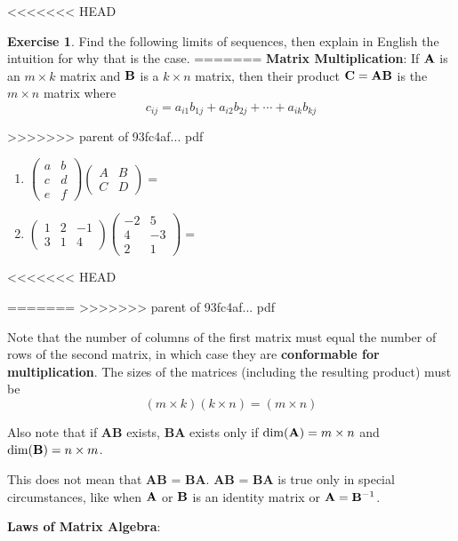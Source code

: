 \documentclass[]{book}
\theoremstyle{definition}
\theoremstyle{definition}
\theoremstyle{definition}
\newtheorem{exercise}{Exercise}[chapter]
\theoremstyle{remark}
\begin{document}
<<<<<<< HEAD
\begin{exercise}
\protect\hypertarget{exr:limseq2}{}{\label{exr:limseq2} }Find the following limits of sequences, then explain in English the intuition for why that is the case.
=======
\textbf{Matrix Multiplication}: If \({\bf A}\) is an \(m\times k\) matrix and \(\bf B\) is a \(k\times n\) matrix, then their product \(\bf C = A B\) is the \(m\times n\) matrix where
\[c_{ij}=a_{i1}b_{1j}+a_{i2}b_{2j}+\cdots+a_{ik}b_{kj}\]

\protect\hypertarget{exm:matrixmulti}{}{\label{exm:matrixmulti} }
>>>>>>> parent of 93fc4af... pdf

\begin{enumerate}
\def\labelenumi{\arabic{enumi}.}
\item
  \(\begin{pmatrix} a&b\\c&d\\e&f \end{pmatrix} \begin{pmatrix} A&B\\C&D \end{pmatrix}  =\)
\item
  \(\begin{pmatrix} 1&2&-1\\3&1&4 \end{pmatrix} \begin{pmatrix} -2&5\\4&-3\\2&1\end{pmatrix} =\)
\end{enumerate}
<<<<<<< HEAD
\end{exercise}
=======
>>>>>>> parent of 93fc4af... pdf

Note that the number of columns of the first matrix must equal the number of rows of the second matrix, in which case they are \textbf{conformable for multiplication}. The sizes of the matrices (including the resulting product) must be \[(m\times k)(k\times n)=(m\times n)\]

Also note that if \textbf{AB} exists, \textbf{BA} exists only if \(\dim({\bf A}) = m \times n\) and \(\dim({\bf B}) = n \times m\).

This does not mean that \textbf{AB} = \textbf{BA}. \textbf{AB} = \textbf{BA} is true only in special circumstances, like when \({\bf A}\) or \({\bf B}\) is an identity matrix or \({\bf A} = {\bf B}^{-1}\).

\textbf{Laws of Matrix Algebra}:
\end{document}
